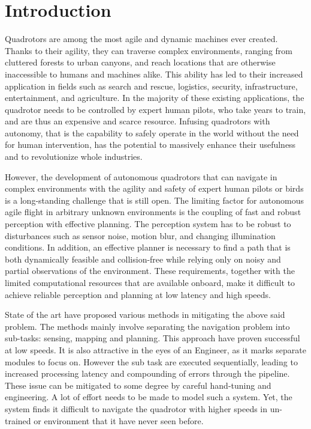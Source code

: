 \clearpage
\chapter{Introduction}

Quadrotors are among the most agile and dynamic machines ever created. Thanks to their agility, they can traverse complex environments, ranging from cluttered forests to urban canyons, and reach locations that are otherwise inaccessible to humans and machines alike. This ability has led to their increased application in fields such as search and rescue, logistics, security, infrastructure, entertainment, and agriculture. In the majority of these existing applications, the quadrotor needs to be controlled by expert human pilots, who take years to train, and are thus an expensive and scarce resource. Infusing quadrotors with autonomy, that is the capability to safely operate in the world without the need for human intervention, has the potential to massively enhance their usefulness and to revolutionize whole industries.

However, the development of autonomous quadrotors that can navigate in complex environments with the agility and safety of expert human pilots or birds is a long-standing challenge that is still open. The limiting factor for autonomous agile flight in arbitrary unknown environments is the coupling of fast and robust perception with effective planning. The perception system has to be robust to disturbances such as sensor noise, motion blur, and changing illumination conditions. In addition, an effective planner is necessary to find a path that is both dynamically feasible and collision-free while relying only on noisy and partial observations of the environment. These requirements, together with the limited computational resources that are available onboard, make it difficult to achieve reliable perception and planning at low latency and high speeds.

\par State of the art have proposed various methods in mitigating the above said problem. The methods mainly involve separating the navigation problem into sub-tasks: sensing, mapping and planning. This approach have proven successful at low speeds. It is also attractive in the eyes of an Engineer, as it marks separate modules to focus on. However the sub task are executed sequentially, leading to increased processing latency and compounding of errors through the pipeline. These issue can be mitigated to some degree by careful hand-tuning and engineering. A lot of effort needs to be made to model such a system. Yet, the system finds it difficult to navigate the quadrotor with higher speeds in un-trained or environment that it have never seen before.

